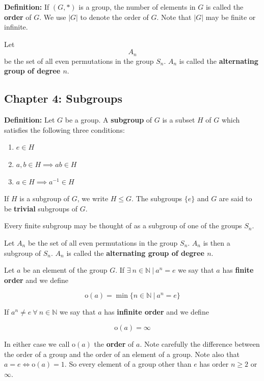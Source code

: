\documentclass{article}
\begin{document}
\textbf{Definition:} If \((G, *)\) is a group, the number of elements in \(G\) is called the \textbf{order} of \(G\). We use \(|G|\) to denote the order of \(G\). Note that \(|G|\) may be finite or infinite.

Let \[A_n\] be the set of all even permutations in the group \(S_n\). \(A_n\) is called the \textbf{alternating group of degree \(n\)}.

\pagebreak
\subsection{Chapter 4: Subgroups}

\textbf{Definition:} Let \(G\) be a group. A \textbf{subgroup} of \(G\) is a subset \(H\) of \(G\) which satisfies the following three conditions:


\begin{enumerate}[1.]

\item \(e \in H\)

\item \(a, b \in H \implies ab \in H\)

\item \(a \in H \implies a^{-1} \in H\)

\end{enumerate}


If \(H\) is a subgroup of \(G\), we write \(H \leq G\). The subgroups \(\{e\}\) and \(G\) are said to be \textbf{trivial} subgroups of \(G\).

Every finite subgroup may be thought of as a subgroup of one of the groups \(S_n\).

Let \(A_n\) be the set of all even permutations in the group \(S_n\). \(A_n\) is then a subgroup of \(S_n\). \(A_n\) is called the \textbf{alternating group of degree \(n\)}.

Let \(a\) be an element of the group \(G\). If \(\exists \ n \in \mathbb{N} \ | \ a^n = e\) we say that \(a\) has \textbf{finite order} and we define

\[
\text{o}(a) = \min \{n \in \mathbb{N} \ | \ a^n = e\}
\]

If \(a^n \neq e \ \forall \ n \in \mathbb{N}\) we say that \(a\) has \textbf{infinite order} and we define

\[
\text{o}(a) = \infty
\]

In either case we call \(\text{o}(a)\) the \textbf{order} of \(a\). Note carefully the difference between the order of a group and the order of an element of a group. Note also that \(a = e \iff \text{o}(a) = 1\). So every element of a group other than \(e\) has order \(n \geq 2\) or \(\infty\).
\end{document}
